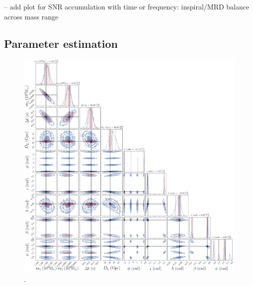\documentclass[aps,showpacs,twocolumn,prd,superscriptaddress,nofootinbib]{revtex4-1}
\begin{document}
-- add plot for SNR accumulation with time or frequency: inspiral/MRD balance across mass range


\subsection{Parameter estimation}
\label{sec:SMBHPE}

\begin{figure}
  \centering
  \includegraphics[width=.98\linewidth]{../plots/corner_smbh_case0_ptmcmc_22_hm.png}
  \caption{.}
  \label{fig:PEsmbh22hmCase0}
\end{figure}
\end{document}
